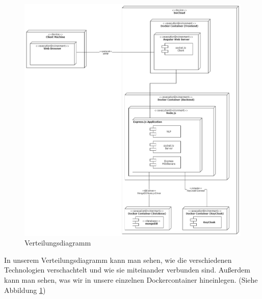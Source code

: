 \begin{figure}[H]
\centering
\includegraphics[width=1.0\textwidth]{bilder/technologien/Verteilunsgdiagramm.png}
\caption{Verteilungsdiagramm}
\label{fig:Verteilungsdiagramm}
\end{figure}
In unserem Verteilungsdiagramm kann man sehen, 
wie die verschiedenen Technologien verschachtelt und wie sie miteinander verbunden sind.
Außerdem kann man sehen, was wir in unsere einzelnen Dockercontainer hineinlegen.
\newline
(Siehe Abbildung \ref{fig:Verteilungsdiagramm})